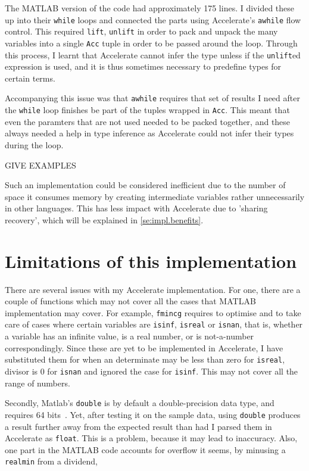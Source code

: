 The MATLAB version of the code had approximately 175 lines. I divided these up into their \texttt{while} loops and connected the parts using Accelerate's \texttt{awhile} flow control. This required \texttt{lift}, \texttt{unlift} in order to pack and unpack the many variables into a single \texttt{Acc} tuple in order to be passed around the loop. Through this process, I learnt that Accelerate cannot infer the type unless if the \texttt{unlift}ed expression is used, and it is thus sometimes necessary to predefine types for certain terms.

Accompanying this issue was that \texttt{awhile} requires that set of results I need after the \texttt{while} loop finishes be part of the tuples wrapped in \texttt{Acc}. This meant that even the paramters that are not used needed to be packed together, and these always needed a help in type inference as Accelerate could not infer their types during the loop.

GIVE EXAMPLES

Such an implementation could be considered inefficient due to the number of space it consumes memory by creating intermediate variables rather unnecessarily in other languages. This has less impact with Accelerate due to 'sharing recovery', which will be explained in \ref{se:impl.benefits}.

\section{Limitations of this implementation} \label{se:impl.limits}

There are several issues with my Accelerate implementation. For one, there are a couple of functions which may not cover all the cases that MATLAB implementation may cover. For example, \texttt{fmincg} requires to optimise and to take care of cases where certain variables are \texttt{isinf}, \texttt{isreal} or \texttt{isnan}, that is, whether a variable has an infinite value, is a real number, or is not-a-number correspondingly. Since these are yet to be implemented in Accelerate, I have substituted them for when an determinate may be less than zero for \texttt{isreal}, divisor is 0 for \texttt{isnan} and ignored the case for \texttt{isinf}. This may not cover all the range of numbers.

Secondly, Matlab's \texttt{double} is by default a double-precision data type, and requires 64 bits~\cite{Mat17}. Yet, after testing it on the sample data, using \texttt{double} produces a result further away from the expected result than had I parsed them in Accelerate as \texttt{float}. This is a problem, because it may lead to inaccuracy. Also, one part in the MATLAB code accounts for overflow it seems, by minusing a \texttt{realmin} from a dividend,

